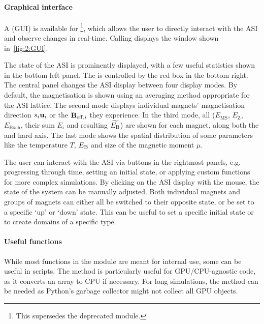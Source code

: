 \paragraph{Graphical interface}
A  (GUI) is available for \hotspice\footnote{
	This supersedes the deprecated  module.
}, which allows the user to directly interact with the ASI and observe changes in real-time.
Calling  displays the window shown in~\cref{fig:2:GUI}. \par
The state of the ASI is prominently displayed, with a few useful statistics shown in the bottom left panel.
The  is controlled by the red box in the bottom right.
The central panel changes the ASI display between four display modes.
By default, the magnetisation is shown using an averaging method appropriate for the ASI lattice.
The second mode displays individual magnets' magnetisation direction $s_i \boldsymbol{\mathbf{u}}_i$ or the  $\boldsymbol{\mathbf{B}}_{\mathrm{eff},i}$ they experience.
In the third mode, all  ($E_\mathrm{MS}$, $E_\mathrm{Z}$, $E_\mathrm{Exch}$, their sum $E_i$ and resulting $\widetilde{E_\mathrm{B}}$) are shown for each magnet, along both the  and hard axis.
The last mode shows the spatial distribution of some parameters like the temperature $T$,  $E_\mathrm{B}$ and size of the magnetic moment $\mu$. \par
The user can interact with the ASI via buttons in the rightmost panels, e.g. progressing through time, setting an initial state, or applying custom functions for more complex simulations.
By clicking on the ASI display with the mouse, the state of the system can be manually adjusted.
Both individual magnets and groups of magnets can either all be switched to their opposite state, or be set to a specific `up' or `down' state.
This can be useful to set a specific initial state or to create domains of a specific type.


\paragraph{Useful functions}
While most functions in the \textbf{} module are meant for internal use, some can be useful in scripts.
The  method is particularly useful for GPU/CPU-agnostic code, as it converts an array to CPU if necessary.
For long simulations, the  method can be needed as Python's garbage collector might not collect all GPU objects.
